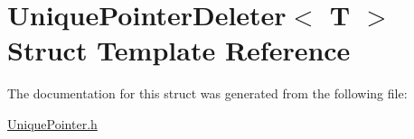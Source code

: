 \hypertarget{struct_unique_pointer_deleter}{}\section{Unique\+Pointer\+Deleter$<$ T $>$ Struct Template Reference}
\label{struct_unique_pointer_deleter}


The documentation for this struct was generated from the following file\+:\begin{DoxyCompactItemize}
\item 
\hyperlink{_unique_pointer_8h}{Unique\+Pointer.\+h}\end{DoxyCompactItemize}
